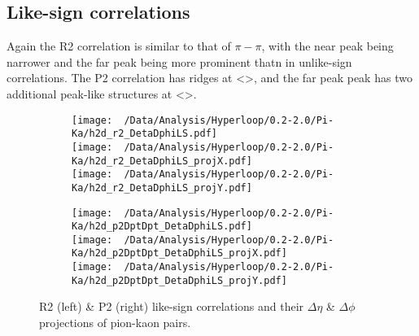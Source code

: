 \documentclass[12pt,a4paper,twoside]{report}
\begin{document}
\subsection{Like-sign correlations}
Again the R2 correlation is similar to that of $\pi-\pi$, with the near peak being narrower and the far peak being more prominent thatn in unlike-sign correlations. The P2 correlation has ridges at <>, and the far peak peak has two additional peak-like structures at <>.
\begin{figure}[H]
	\begin{subfigure}{0.49\linewidth}
		\texttt{[image: ~/Data/Analysis/Hyperloop/0.2-2.0/Pi-Ka/h2d\_r2\_DetaDphiLS.pdf]}\\
		\texttt{[image: ~/Data/Analysis/Hyperloop/0.2-2.0/Pi-Ka/h2d\_r2\_DetaDphiLS\_projX.pdf]}\\
		\texttt{[image: ~/Data/Analysis/Hyperloop/0.2-2.0/Pi-Ka/h2d\_r2\_DetaDphiLS\_projY.pdf]}\\
	\end{subfigure}
	\begin{subfigure}{0.49\linewidth}
		\texttt{[image: ~/Data/Analysis/Hyperloop/0.2-2.0/Pi-Ka/h2d\_p2DptDpt\_DetaDphiLS.pdf]}\\
		\texttt{[image: ~/Data/Analysis/Hyperloop/0.2-2.0/Pi-Ka/h2d\_p2DptDpt\_DetaDphiLS\_projX.pdf]}\\
		\texttt{[image: ~/Data/Analysis/Hyperloop/0.2-2.0/Pi-Ka/h2d\_p2DptDpt\_DetaDphiLS\_projY.pdf]}\\
	\end{subfigure}
	\caption{R2 (left) \& P2 (right) like-sign correlations and their $\Delta\eta$ \& $\Delta\phi$ projections of pion-kaon pairs.}
\end{figure}
\end{document}

